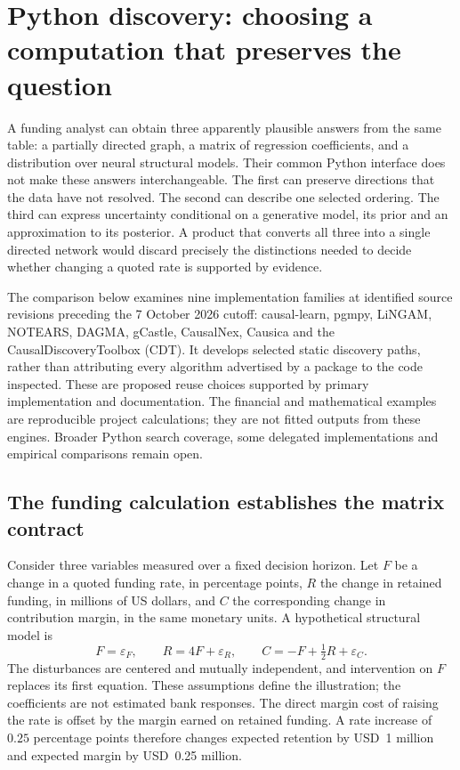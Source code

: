 \section{Python discovery: choosing a computation that preserves the question}
\label{exec13:python-discovery}

A funding analyst can obtain three apparently plausible answers from the same
table: a partially directed graph, a matrix of regression coefficients, and a
distribution over neural structural models. Their common Python interface does
not make these answers interchangeable. The first can preserve directions that
the data have not resolved. The second can describe one selected ordering. The
third can express uncertainty conditional on a generative model, its prior and
an approximation to its posterior. A product that converts all three into a
single directed network would discard precisely the distinctions needed to
decide whether changing a quoted rate is supported by evidence.

The comparison below examines nine implementation families at identified source
revisions preceding the 7 October 2026 cutoff: causal-learn, pgmpy, LiNGAM,
NOTEARS, DAGMA, gCastle, CausalNex, Causica and the CausalDiscoveryToolbox (CDT).
It develops selected static discovery paths, rather than attributing every
algorithm advertised by a package to the code inspected. These are proposed
reuse choices supported by primary implementation and documentation. The
financial and mathematical examples are reproducible project calculations;
they are not fitted outputs from these engines. Broader Python search coverage,
some delegated implementations and empirical comparisons remain open.

\subsection{The funding calculation establishes the matrix contract}

Consider three variables measured over a fixed decision horizon. Let \(F\) be a
change in a quoted funding rate, in percentage points, \(R\) the change in
retained funding, in millions of US dollars, and \(C\) the corresponding change
in contribution margin, in the same monetary units. A hypothetical structural
model is
\begin{equation}
 F=\varepsilon_F,\qquad R=4F+\varepsilon_R,\qquad
 C=-F+\tfrac12R+\varepsilon_C.
 \label{exec13:pydisc-funding}
\end{equation}
The disturbances are centered and mutually independent, and intervention on
\(F\) replaces its first equation. These assumptions define the illustration;
the coefficients are not estimated bank responses. The direct margin cost of
raising the rate is offset by the margin earned on retained funding. A rate
increase of \(0.25\) percentage points therefore changes expected retention by
USD~1 million and expected margin by USD~0.25 million.

